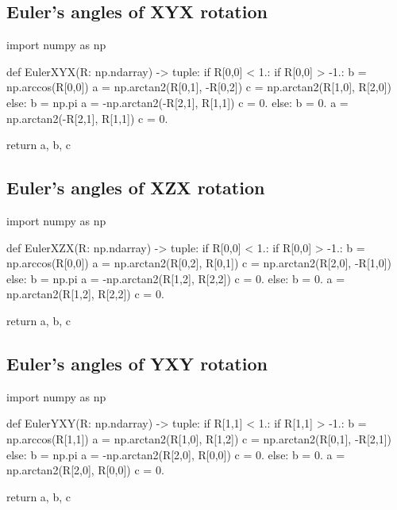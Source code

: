 \subsection{Euler's angles of \textbf{XYX} rotation}

\begin{python}
import numpy as np

def EulerXYX(R: np.ndarray) -> tuple:
    if R[0,0] < 1.:
        if R[0,0] > -1.:
            b = np.arccos(R[0,0])
            a = np.arctan2(R[0,1], -R[0,2])
            c = np.arctan2(R[1,0], R[2,0])
        else:
            b = np.pi
            a = -np.arctan2(-R[2,1], R[1,1])
            c = 0.
    else:
        b = 0.
        a = np.arctan2(-R[2,1], R[1,1])
        c = 0.

    return a, b, c
\end{python}

\subsection{Euler's angles of \textbf{XZX} rotation}

\begin{python}
import numpy as np

def EulerXZX(R: np.ndarray) -> tuple:
    if R[0,0] < 1.:
        if R[0,0] > -1.:
            b = np.arccos(R[0,0])
            a = np.arctan2(R[0,2], R[0,1])
            c = np.arctan2(R[2,0], -R[1,0])
        else:
            b = np.pi
            a = -np.arctan2(R[1,2], R[2,2])
            c = 0.
    else:
        b = 0.
        a = np.arctan2(R[1,2], R[2,2])
        c = 0.

    return a, b, c
\end{python}

\subsection{Euler's angles of \textbf{YXY} rotation}

\begin{python}
import numpy as np

def EulerYXY(R: np.ndarray) -> tuple:
    if R[1,1] < 1.:
        if R[1,1] > -1.:
            b = np.arccos(R[1,1])
            a = np.arctan2(R[1,0], R[1,2])
            c = np.arctan2(R[0,1], -R[2,1])
        else:
            b = np.pi
            a = -np.arctan2(R[2,0], R[0,0])
            c = 0.
    else:
        b = 0.
        a = np.arctan2(R[2,0], R[0,0])
        c = 0.

    return a, b, c
\end{python}

